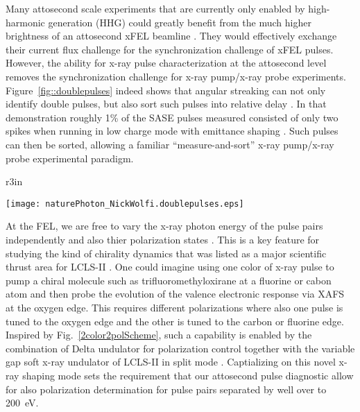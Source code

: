 Many attosecond scale experiments that are currently only enabled by high-harmonic generation (HHG)\cite{Lewenstein1994,Hentschel2001,attoclock2008,Chen2014,Biegert2014,Schmidt2016,Biegert2016,WornerSci2017,Zenghu2017} could greatly benefit from the much higher brightness of an attosecond xFEL beamline \cite{Ding2009,Xiang2009,xLEAP}.
They would effectively exchange their current flux challenge for the synchronization challenge of xFEL pulses.
However, the ability for x-ray pulse characterization at the attosecond level removes the synchronization challenge for x-ray pump/x-ray probe experiments.
Figure~\ref{fig::doublepulses} indeed shows that angular streaking can not only identify double pulses, but also sort such pulses into relative delay \cite{Nick2018}.
In that demonstration roughly 1\% of the SASE pulses measured consisted of only two spikes when running in low charge mode with emittance shaping \cite{EmmaFoil}.
Such pulses can then be sorted, allowing a familiar ``measure-and-sort'' x-ray pump/x-ray probe experimental paradigm.

\begin{wrapfigure}[12]{r}{3in}
\centerline{\texttt{[image: naturePhoton\_NickWolfi.doublepulses.eps]}}
\vspace{-0.5\baselineskip}
\caption{\label{fig::doublepulses}Reproduced from Ref.~\cite{Nick2018}.
}
\end{wrapfigure}

At the FEL, we are free to vary the x-ray photon energy of the pulse pairs independently \cite{Lutman13_twocolor,LutmanFreshSlice2016} and also thier polarization states \cite{Lutman2016,Dichroism2016}.
This is a key feature for studying the kind of chirality dynamics that was listed as a major scientific thrust area for LCLS-II \cite{lcls2_opportunities}.
One could imagine using one color of x-ray pulse to pump a chiral molecule such as trifluoromethyloxirane \cite{Ilchen2017} at a fluorine or cabon atom and then probe the evolution of the valence electronic response via XAFS at the oxygen edge.
This requires different polarizations \cite{Lutman2016,Dichroism2016} where also one pulse is tuned to the oxygen edge and the other is tuned to the carbon or fluorine edge.
Inspired by Fig.~\ref{2color2polScheme}, such a capability is enabled by the combination of Delta undulator for polarization control together with the variable gap soft x-ray undulator of LCLS-II in split mode \cite{Lutman13_twocolor,LutmanFreshSlice2016}.
Captializing on this novel x-ray shaping mode sets the requirement that our attosecond pulse diagnostic allow for also polarization determination for pulse pairs separated by well over to 200~eV.

